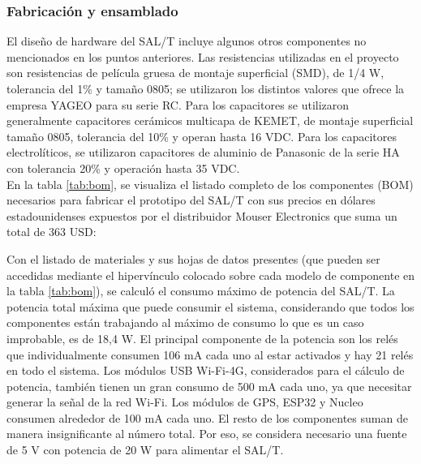\subsubsection{Fabricación y ensamblado}

El diseño de hardware del SAL/T incluye algunos otros componentes no mencionados en los puntos anteriores. Las resistencias utilizadas en el proyecto son resistencias de película gruesa de montaje superficial (SMD), de 1/4 W, tolerancia del 1\% y tamaño 0805; se utilizaron los distintos valores que ofrece la empresa YAGEO para su serie RC. Para los capacitores se utilizaron generalmente capacitores cerámicos multicapa de KEMET, de montaje superficial tamaño 0805, tolerancia del 10\% y operan hasta 16 VDC. Para los capacitores electrolíticos, se utilizaron capacitores de aluminio de Panasonic de la serie HA con tolerancia 20\% y operación hasta 35 VDC. \\ 

En la tabla \ref{tab:bom}, se visualiza el listado completo de los componentes (BOM) necesarios para fabricar el prototipo del SAL/T con sus precios en dólares estadounidenses expuestos por el distribuidor Mouser Electronics que suma un total de 363 USD: 




Con el listado de materiales y sus hojas de datos presentes (que pueden ser accedidas mediante el hipervínculo colocado sobre cada modelo de componente en la tabla \ref{tab:bom}), se calculó el consumo máximo de potencia del SAL/T. La potencia total máxima que puede consumir el sistema, considerando que todos los componentes están trabajando al máximo de consumo lo que es un caso improbable, es de 18,4 W. El principal componente de la potencia son los relés que individualmente consumen 106 mA cada uno al estar activados y hay 21 relés en todo el sistema. Los módulos USB Wi-Fi-4G, considerados para el cálculo de potencia, también tienen un gran consumo de 500 mA cada uno, ya que necesitar generar la señal de la red Wi-Fi. Los módulos de GPS, ESP32 y Nucleo consumen alrededor de 100 mA cada uno. El resto de los componentes suman de manera insignificante al número total. Por eso, se considera necesario una fuente de 5 V con potencia de 20 W para alimentar el SAL/T. \\


